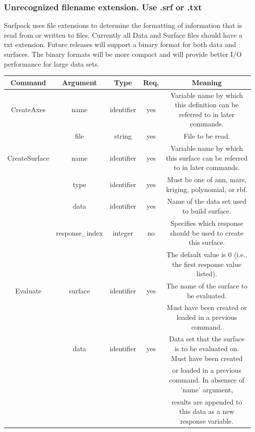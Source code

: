 \documentclass{article}
\begin{document}
\subsubsection{ Unrecognized filename extension.  Use .srf or .txt}
Surfpack uses file extensions to determine the formatting of information that is read from or written to files.  Currently all Data and Surface files should have a txt extension.  Future releases will support a binary format for both data and surfaces.  The binary formats will be more compact and will provide better I/O performance for large data sets.

\appendix

\begin{table}
  \centering
  \begin{tabular}{|c|c|c|c|c|}
    \hline
    \textbf{Command} & \textbf{Argument} & \textbf{Type} &
    \textbf{Req.} & \textbf{Meaning}\\
    \hline
    CreateAxes & name & identifier & yes & Variable name by which
    this definition can be referred to in later commands.\\
    \hline
    & file & string & yes & File to be read.\\
    \hline
    CreateSurface & name & identifier & yes & Variable name by which
    this surface can be referred to in later commands.\\
    \hline
    & type & identifier & yes & Must be one of ann, mars, kriging, polynomial,
    or rbf.\\
    \hline
    & data & identifier & yes & Name of the data set used to
    build surface.\\
    \hline
    & response\_index & integer & no & Specifies which response
    should be used to create this surface.\\
    & & & & The default value is 0 (i.e., the first response value
    listed).\\
    \hline
    Evaluate & surface & identifier & yes & The name of the surface to
    be evaluated.\\
    & & & & Must have been created or loaded in a previous command.\\
    \hline
    & data & identifier & yes & Data set that the surface is to
    be evaluated on.  Must have been created  \\
    & & & & or loaded in a previous command.  In absensce of 'name' argument,\\
    & & & & results are appended to this data as a new response variable. \\

\end{tabular}
\end{table}
\end{document}

